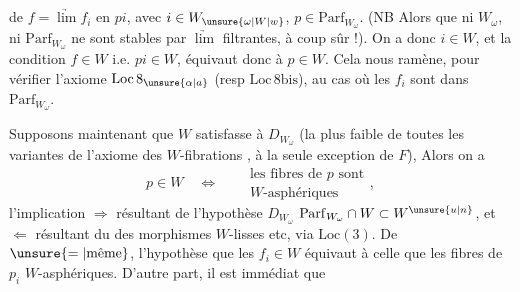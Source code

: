 de $f=\underrightarrow{\lim} f_i$ en $pi$, avec $i\in W_{\unsure{\omega|W|w}}$, $p\in\mathrm{Parf}_{W_\omega}$. (NB Alors que ni $W_\omega$, ni $\mathrm{Parf}_{W_\omega}$ ne sont stables par $\underrightarrow{\lim}$ filtrantes, à coup sûr !). On a donc $i\in W$, et  la condition $f\in W$ i.e. $pi\in W$, équivaut donc à $p\in W$.
Cela nous ramène, pour vérifier l'axiome $\mathrm{Loc}\,8_{\unsure{\alpha|a}}$ (resp $\mathrm{Loc}\,8\mathrm{bis}$), au cas où les $f_i$ sont dans $\mathrm{Parf}_{W_\omega}$.

Supposons maintenant que $W$ satisfasse à $D_{W_\omega}$ (la plus faible de toutes les variantes  de l'axiome des $W$-fibrations , à la seule exception de $F$),   Alors on a
\[
p\in W \quad\Longleftrightarrow\quad
\begin{aligned}&\text{les fibres de }p\text{ sont}\\[-2pt]
& W\text{-asphériques}\end{aligned},
\]
l'implication $\Longrightarrow$ résultant de l'hypothèse $D_{W_\omega}$ $\mathrm{Parf}_{W_\omega}\cap W\subset W^{\unsure{u|n}}$, et $\Longleftarrow$ résultant du  des morphismes $W$-lisses etc, via $\mathrm{Loc}(3)$. De $\unsure{=|\text{même}}$, l'hypothèse que les $f_i\in W$ équivaut à celle que les fibres de $p_i$  $W$-asphériques.  D'autre part, il est immédiat que
